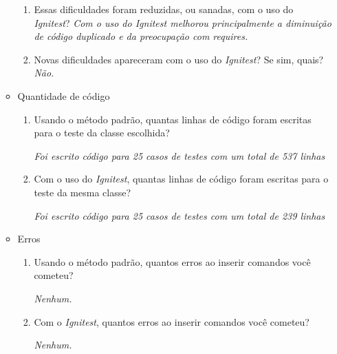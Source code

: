 \begin{itemize}
\begin{itemize}
\begin{enumerate}
                        \item Essas dificuldades foram reduzidas, ou sanadas, com o uso do \textit{Ignitest}?
                            \subitem \textit{Com o uso do Ignitest melhorou principalmente a diminuição de código duplicado e da preocupação com requires.} 
                        
                        \item Novas dificuldades apareceram com o uso do \textit{Ignitest}? Se sim, quais?
                            \subitem \textit{Não.}

                    \end{enumerate}
               
                \item Quantidade de código
                    \begin{enumerate}
                        \item Usando o método padrão, quantas linhas de código foram escritas para o teste da classe escolhida?

                        	\subitem \textit{Foi escrito código para 25 casos de testes com um total de 537 linhas}

                        \item Com o uso do \textit{Ignitest}, quantas linhas de código foram escritas para o teste da mesma classe?

                        	\subitem \textit{Foi escrito código para 25 casos de testes com um total de 239 linhas}

                    \end{enumerate}

\vfill
\pagebreak

                \item Erros
                    \begin{enumerate}
                        \item Usando o método padrão, quantos erros ao inserir comandos você cometeu?

                            \subitem \textit{Nenhum.}

                        \item Com o \textit{Ignitest}, quantos erros ao inserir comandos você cometeu?

                            \subitem \textit{Nenhum.}

                    \end{enumerate}
            \end{itemize}
        

\end{itemize}
